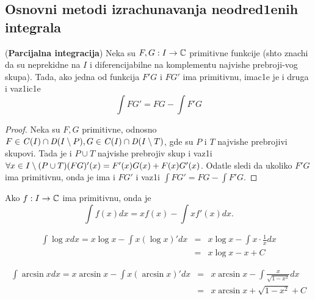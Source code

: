 \documentclass[../main.tex]{subfiles}
\begin{document}
\subsection{Osnovni metodi izrachunavanja neodred1enih integrala}
\begin{tvr}
(\textbf{Parcijalna integracija}) Neka su $F,G:I\to \mathbb{C}$ primitivne funkcije (shto znachi da su neprekidne na $I$
i diferencijabilne na komplementu najvishe prebroji-vog skupa). Tada, ako jedna od funkcija $F'G$ i $FG'$ ima primitivnu, imac1e je i druga i vaz1ic1e
$$\int FG' = FG - \int F'G$$
\end{tvr}
\begin{proof}
Neka su $F,G$ primitivne, odnosno 
$F\in \mathit{C}(I) \cap \mathit D(I\setminus P), G\in \mathit{C}(I) \cap \mathit D(I\setminus T)$, gde su $P$ i $T$ najvishe prebrojivi skupovi.
Tada je i $P \cup T$ najvishe prebrojiv skup i vaz1i $\forall x \in I \setminus (P\cup T) (FG)'(x)=F'(x)G(x)+F(x)G'(x)$. Odatle sledi da ukoliko $F'G$ ima primitivnu,
onda je ima i $FG'$ i vaz1i $\int FG' = FG - \int F'G$. 
\end{proof}
\begin{posl}
Ako $f:I\to \mathbb{C}$ ima primitivnu, onda je 
$$\int f(x) dx=x f(x) - \int x f'(x) dx.$$
\end{posl}

\begin{pr}
\begin{eqnarray*}
 \int \log x dx = x \log x - \int x (\log x)' dx 
 &=& x\log x - \int x \cdot \frac{1}{x} dx \\
 &=& x \log x - x + C
\end{eqnarray*}
\end{pr}

\begin{pr}
\begin{eqnarray*}
 \int \arcsin x dx = x \arcsin x - \int x (\arcsin x)' dx 
 &=& x\arcsin x - \int \frac{x}{\sqrt{1-x^2}}dx \\
 &=& x \arcsin x +\sqrt{1-x^2} + C
\end{eqnarray*}
\end{pr}
\end{document}
